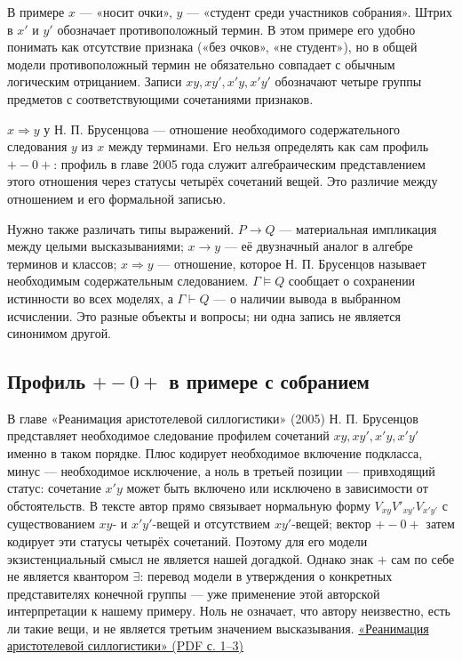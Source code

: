 \documentclass[12pt,a4paper]{article}
\begin{document}
В примере \(x\) — «носит очки», \(y\) — «студент среди участников собрания». Штрих в \(x'\) и \(y'\) обозначает противоположный термин. В этом примере его удобно понимать как отсутствие признака («без очков», «не студент»), но в общей модели противоположный термин не обязательно совпадает с обычным логическим отрицанием. Записи \(xy,xy',x'y,x'y'\) обозначают четыре группы предметов с соответствующими сочетаниями признаков.

\(x\Rightarrow y\) у Н. П. Брусенцова — отношение необходимого содержательного следования \(y\) из \(x\) между терминами. Его нельзя определять как сам профиль \(+-0+\): профиль в главе 2005 года служит алгебраическим представлением этого отношения через статусы четырёх сочетаний вещей. Это различие между отношением и его формальной записью.

Нужно также различать типы выражений. \(P\to Q\) — материальная импликация между целыми высказываниями; \(x\to y\) — её двузначный аналог в алгебре терминов и классов; \(x\Rightarrow y\) — отношение, которое Н. П. Брусенцов называет необходимым содержательным следованием. \(\Gamma\models Q\) сообщает о сохранении истинности во всех моделях, а \(\Gamma\vdash Q\) — о наличии вывода в выбранном исчислении. Это разные объекты и вопросы; ни одна запись не является синонимом другой.

\subsection{Профиль \(+-0+\) в примере с собранием}

В главе «Реанимация аристотелевой силлогистики» (2005) Н. П. Брусенцов представляет необходимое следование профилем сочетаний \(xy,xy',x'y,x'y'\) именно в таком порядке. Плюс кодирует необходимое включение подкласса, минус — необходимое исключение, а ноль в третьей позиции — привходящий статус: сочетание \(x'y\) может быть включено или исключено в зависимости от обстоятельств. В тексте автор прямо связывает нормальную форму \(V_{xy}V'_{xy'}V_{x'y'}\) с существованием \(xy\)- и \(x'y'\)-вещей и отсутствием \(xy'\)-вещей; вектор \(+-0+\) затем кодирует эти статусы четырёх сочетаний. Поэтому для его модели экзистенциальный смысл не является нашей догадкой. Однако знак \(+\) сам по себе не является квантором \(\exists\): перевод модели в утверждения о конкретных представителях конечной группы — уже применение этой авторской интерпретации к нашему примеру. Ноль не означает, что автору неизвестно, есть ли такие вещи, и не является третьим значением высказывания. \href{https://ternarycomp.cs.msu.ru/Papers/Rea.pdf}{«Реанимация аристотелевой силлогистики» (PDF с. 1–3)}
\end{document}
